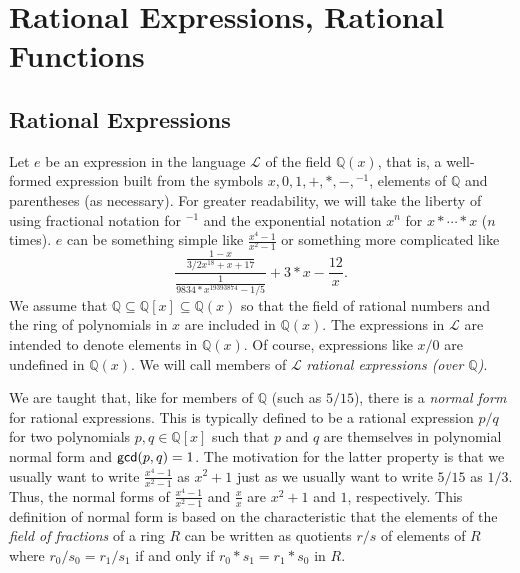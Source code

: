 \documentclass[fleqn]{llncs}
\newcommand{\QQ}{\ensuremath{\mathbb{Q}}}
\newcommand{\Lang}{\ensuremath{\mathcal{L}}}
\begin{document}
\section{Rational Expressions, Rational Functions}

\subsection{Rational Expressions}

Let $e$ be an expression in the language $\Lang$ of the field
$\QQ(x)$, that is, a well-formed expression built from the symbols $x,
0, 1, +, *, -, \phantom{}^{-1}$, elements of $\QQ$ and parentheses (as
necessary).  For greater readability, we will take the liberty of
using fractional notation for $\phantom{}^{-1}$ and the exponential
notation $x^n$ for $x * \cdots * x$ ($n$ times).  $e$ can be something
simple like $\frac{x^4-1}{x^2-1}$ or something more complicated like
\begin{equation*}
\frac{\frac{1-x}{3/2 x^{18} + x + 17}}
     {\frac{1}{9834*x^{19393874}-1/5}}+3*x -\frac{12}{x}.
\end{equation*}
We assume that $\QQ \subseteq \QQ[x] \subseteq \QQ(x)$ so that the
field of rational numbers and the ring of polynomials in $x$ are
included in $\QQ(x)$.  The expressions in $\Lang$ are intended to
denote elements in $\QQ(x)$.  Of course, expressions like $x/0$ are
undefined in $\QQ(x)$.  We will call members of $\Lang$ \emph{rational
  expressions (over $\QQ$)}.

We are taught that, like for members of $\QQ$ (such as $5/15$), there
is a \emph{normal form} for rational expressions. This is typically
defined to be a rational expression $p/q$ for two polynomials $p,q \in \QQ[x]$
such that $p$ and $q$ are themselves in polynomial normal form and
$\mbox{\sf gcd}(p,q) = 1$.  The motivation for the latter
property is that we usually want to write $\frac{x^4-1}{x^2-1}$ as
$x^2 + 1$ just as we usually want to write $5/15$ as $1/3$.  Thus, the
normal forms of $\frac{x^4-1}{x^2-1}$ and $\frac{x}{x}$ are $x^2 + 1$
and $1$, respectively.  This definition of normal form is based on the
characteristic that the elements of the \emph{field of fractions} of a
ring $R$ can be written as quotients $r/s$ of elements of $R$ where
$r_0/s_0 = r_1/s_1$ if and only if $r_0 * s_1 = r_1 * s_0$ in $R$.
\end{document}
